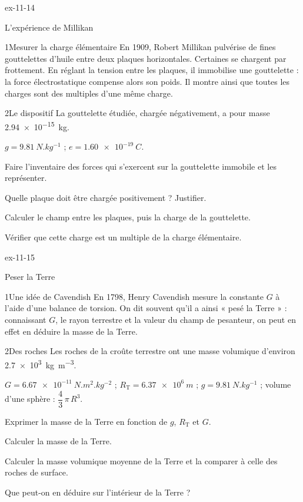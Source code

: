 \begin{blocLivre}{ex-11-14}
\begin{exercice}[3]{L'expérience de Millikan}
\begin{docu}{1}{Mesurer la charge élémentaire}
En 1909, Robert Millikan pulvérise de fines gouttelettes d'huile entre deux plaques horizontales. Certaines se chargent
par frottement. En réglant la tension entre les plaques, il immobilise une gouttelette : la force électrostatique compense
alors son poids. Il montre ainsi que toutes les charges sont des multiples d'une même charge.
\end{docu}
\begin{docu}{2}{Le dispositif}
La gouttelette étudiée, chargée négativement, a pour masse \qty{2,94e-15}{kg}.
\end{docu}
\begin{donnees}
$g=\qty{9,81}{N.kg^{-1}}$ ; $e=\qty{1,60e-19}{C}$.
\end{donnees}
\begin{questions}
\item Faire l'inventaire des forces qui s'exercent sur la gouttelette immobile et les représenter.
\item Quelle plaque doit être chargée positivement ? Justifier.
\item Calculer le champ entre les plaques, puis la charge de la gouttelette.
\item \initiative Vérifier que cette charge est un multiple de la charge élémentaire.
\end{questions}
\end{exercice}
\end{blocLivre}
\begin{blocLivre}{ex-11-15}
\begin{exercice}[3]{Peser la Terre}
\begin{docu}{1}{Une idée de Cavendish}
En 1798, Henry Cavendish mesure la constante $G$ à l'aide d'une balance de torsion. On dit souvent qu'il a ainsi « pesé la
Terre » : connaissant $G$, le rayon terrestre et la valeur du champ de pesanteur, on peut en effet en déduire la masse de la
Terre.
\end{docu}
\begin{docu}{2}{Des roches}
Les roches de la croûte terrestre ont une masse volumique d'environ \qty{2,7e3}{kg.m^{-3}}.
\end{docu}
\begin{donnees}
$G=\qty{6,67e-11}{N.m^2.kg^{-2}}$ ; $R_\mathrm{T}=\qty{6,37e6}{m}$ ; $g=\qty{9,81}{N.kg^{-1}}$ ; volume d'une sphère : $\dfrac{4}{3}\,\pi\,R^3$.
\end{donnees}
\begin{questions}
\item Exprimer la masse de la Terre en fonction de $g$, $R_\mathrm{T}$ et $G$.
\item Calculer la masse de la Terre.
\item \initiative Calculer la masse volumique moyenne de la Terre et la comparer à celle des roches de surface.
\item Que peut-on en déduire sur l'intérieur de la Terre ?
\end{questions}
\end{exercice}
\end{blocLivre}
